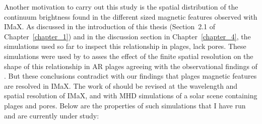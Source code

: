 \documentclass[goettingen, gauss, print]{thesis}
\begin{document}
Another motivation to carry out this study is the spatial distribution of the continuum brightness found in the different sized magnetic features observed with IMaX. As discussed in the introduction of this thesis (Section~2.1 of Chapter~\ref{chapter_1}) and in the discussion section in Chapter~\ref{chapter_4}, the simulations used so far to inspect this relationship in plages, lack pores. These simulations were used by \cite{danilovic_relation_2013} to asses the effect of the finite spatial resolution on the shape of this relationship in AR plages agreeing with the observational findings of \cite{kobel_continuum_2011}. But these conclusions contradict with our findings that plages magnetic features are resolved in IMaX. The work of \cite{danilovic_relation_2013} should be revised at the wavelength and spatial resolution of IMaX, and with MHD simulations of a solar scene containing plages and pores. Below are the properties of such simulations that I have run and are currently under study:
\end{document}
